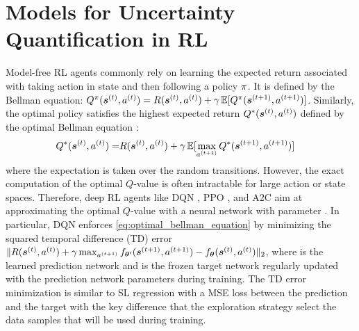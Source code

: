 \vspace{-3mm}
\section{Models for Uncertainty Quantification in RL}
\label{sec:model_011}

Model-free RL agents commonly rely on learning the expected return  associated with taking action  in state  and then following a policy $\operatorname{\pi}$. It is defined by the Bellman equation:
    $Q^{\operatorname{\pi}}(\bm{s}^{(t)}, a^{(t)}) = R(\bm{s}^{(t)}, a^{(t)}) + \gamma \operatorname{\mathbb{E}} [Q^{\operatorname{\pi}}(\bm{s}^{(t+1)}, a^{(t+1)})]$.
Similarly, the optimal policy \smash{$\policy^*$} satisfies the highest expected return $Q^{*}(\bm{s}^{(t)}, a^{(t)})$ defined by the optimal Bellman equation \citep{dynamic-programming}:
\begin{equation}
  \begin{aligned}
\label{eq:optimal_bellman_equation}
    Q^{*}(\bm{s}^{(t)}, a^{(t)}) = & R(\bm{s}^{(t)}, a^{(t)}) + \gamma \operatorname{\mathbb{E}} [\max_{a^{(t+1)}} Q^{*}(\bm{s}^{(t+1)}, a^{(t+1)})]
\end{aligned}
\end{equation}
where the expectation is taken over the random transitions. However, the exact computation of the optimal $Q$-value is often intractable for large action or state spaces. Therefore, deep RL agents like DQN \citep{dqn}, PPO \citep{ppo}, and A2C \citep{a2c} 
aim at approximating the optimal $Q$-value  with a neural network  with parameter \smash{$\bm{\theta}$}. In particular, DQN enforces \cref{eq:optimal_bellman_equation} by minimizing the squared temporal difference (TD) error $\|R(\bm{s}^{(t)}, a^{(t)}) + \gamma \max_{a^{(t+1)}} f_{\bm{\theta}'}(\bm{s}^{(t+1)}, a^{(t+1)}) - f_{\bm{\theta}}(\bm{s}^{(t)}, a^{(t)})\|_2$, where  is the learned prediction network and  is the frozen target network regularly updated with the prediction network parameters during training. The TD error minimization is similar to SL regression with a MSE loss between the prediction  and the target  with the key difference that the exploration strategy select the data samples that will be used during training.

